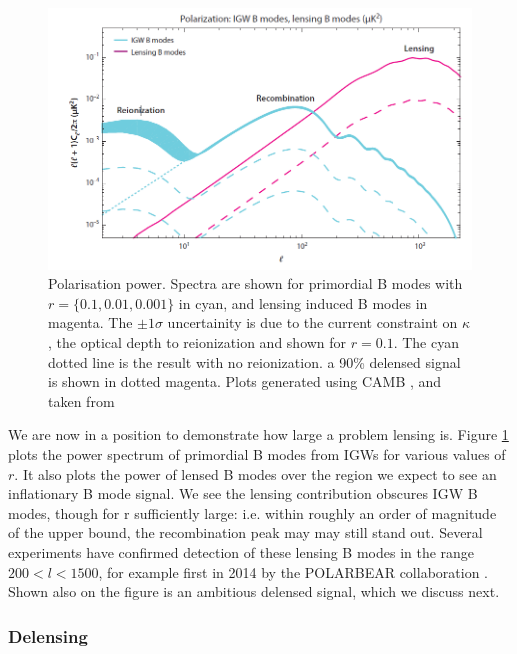 \documentclass[a4paper,10pt]{article}
\begin{document}
\begin{figure}[h]
  \includegraphics[width=\linewidth]{lensingfucksus.png}
  \caption{Polarisation power. Spectra are shown for primordial B modes with $r=\{0.1,0.01,0.001\}$ in cyan, and lensing induced B modes in magenta. The $\pm1\sigma$ uncertainity is due to the current constraint on $\kappa$, the optical depth to reionization and shown for $r=0.1$. The cyan dotted line is the result with no reionization. a 90\% delensed signal is shown in dotted magenta. Plots generated using CAMB \cite{CAMBInfo}, and taken from \cite{QBM}}
  \label{lensingisfucked}
\end{figure}

We are now in a position to demonstrate how large a problem lensing is. Figure \ref{lensingisfucked} plots the power spectrum of primordial B modes from IGWs for various values of $r$. It also plots the power of lensed B modes over the region we expect to see an inflationary B mode signal. We see the lensing contribution obscures IGW B modes, though for r sufficiently large: i.e. within roughly an order of magnitude of the upper bound, the recombination peak may may still stand out. Several experiments have confirmed detection of these lensing B modes in the range $200<l<1500$, for example first in 2014 by the POLARBEAR collaboration \cite{polarbear}. Shown also on the figure is an ambitious delensed signal, which we discuss next.

\subsubsection{Delensing}
\end{document}
